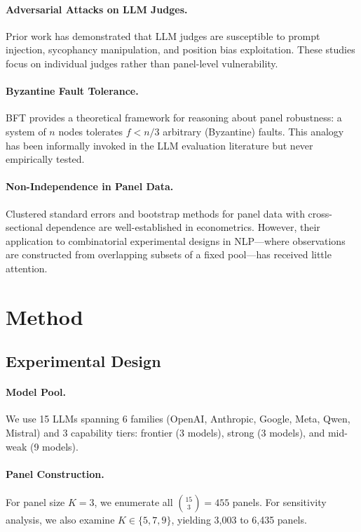 \documentclass[11pt]{article}
\begin{document}
\paragraph{Adversarial Attacks on LLM Judges.} Prior work has demonstrated that LLM judges are susceptible to prompt injection, sycophancy manipulation, and position bias exploitation. These studies focus on individual judges rather than panel-level vulnerability.

\paragraph{Byzantine Fault Tolerance.} BFT provides a theoretical framework for reasoning about panel robustness: a system of $n$ nodes tolerates $f < n/3$ arbitrary (Byzantine) faults. This analogy has been informally invoked in the LLM evaluation literature but never empirically tested.

\paragraph{Non-Independence in Panel Data.} Clustered standard errors and bootstrap methods for panel data with cross-sectional dependence are well-established in econometrics. However, their application to combinatorial experimental designs in NLP---where observations are constructed from overlapping subsets of a fixed pool---has received little attention.


\section{Method}

\subsection{Experimental Design}

\paragraph{Model Pool.} We use 15 LLMs spanning 6 families (OpenAI, Anthropic, Google, Meta, Qwen, Mistral) and 3 capability tiers: frontier (3 models), strong (3 models), and mid-weak (9 models).

\paragraph{Panel Construction.} For panel size $K{=}3$, we enumerate all $\binom{15}{3} = 455$ panels. For sensitivity analysis, we also examine $K \in \{5, 7, 9\}$, yielding 3{,}003 to 6{,}435 panels.
\end{document}
